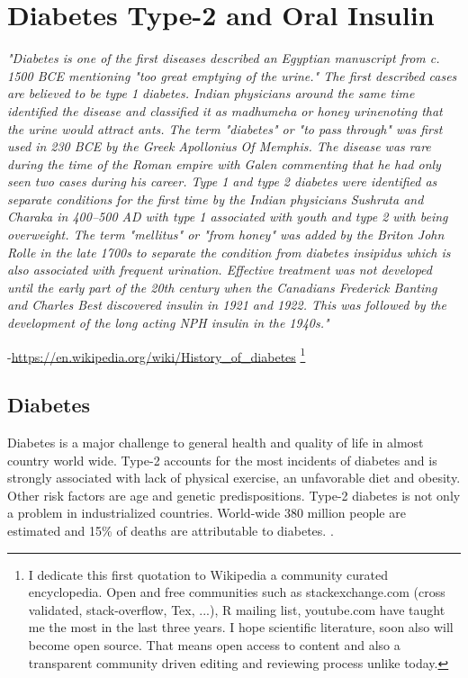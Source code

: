 \chapter{Diabetes Type-2 and Oral Insulin}


\textit{"Diabetes is one of the first diseases described \DIFdelbegin {}\DIFdelend \DIFaddbegin {}\DIFaddend an Egyptian manuscript from c. 1500 BCE mentioning "too great emptying of the urine." The first described cases are believed to be \DIFdelbegin {}\DIFdelend type 1 diabetes. Indian physicians around the same time identified the disease and classified it as madhumeha or honey urine\DIFaddbegin \DIFadd{, }\DIFaddend noting that the urine would attract ants. The term "diabetes" or "to pass through" was first used in 230 BCE by the Greek Apollonius Of Memphis. The disease was rare during the time of the Roman empire with Galen commenting that he had only seen two cases during his career. Type 1 and type 2 diabetes were identified as separate conditions for the first time by the Indian physicians Sushruta and Charaka in 400–500 AD with type 1 associated with youth and type 2 with being overweight. The term "mellitus" or "from honey" was added by the Briton John Rolle in the late 1700s to separate the condition from diabetes insipidus which is also associated with frequent urination. Effective treatment was not developed until the early part of the 20th century when the Canadians Frederick Banting and Charles Best discovered insulin in 1921 and 1922. This was followed by the development of the long acting NPH insulin in the 1940s."}

-\url{https://en.wikipedia.org/wiki/History_of_diabetes} \footnote{I dedicate this first quotation to Wikipedia a community curated encyclopedia. Open and free communities such as stackexchange.com (cross validated, stack-overflow, Tex, ...), R mailing list, youtube.com have taught me the most in the last three years. I hope scientific literature, soon also will become open source. That means open access to content and also a transparent community driven editing and reviewing process unlike today.}
\newpage

\section{Diabetes}
Diabetes is a major challenge to general health and quality of life in almost \DIFdelbegin {}\DIFdelend \DIFaddbegin {}\DIFaddend country world wide. Type-2 accounts for the most incidents of diabetes and is strongly associated with lack of physical exercise, an unfavorable diet and obesity. Other risk factors are age and genetic predispositions. Type-2 diabetes is not only a problem in industrialized countries.  World-wide 380 million people are estimated \DIFaddbegin {}\DIFaddend and 15\% of deaths are attributable to diabetes. \cite{aguiree2013idf}.


